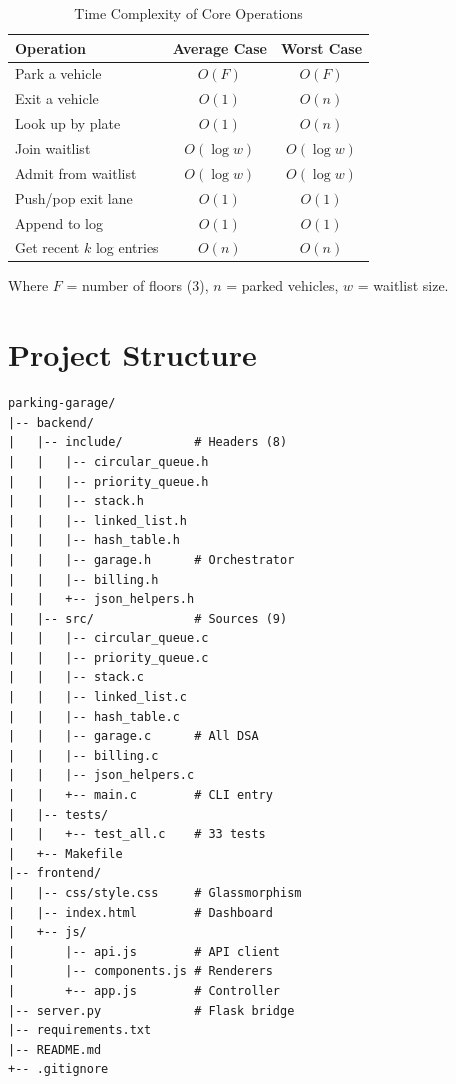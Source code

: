 \documentclass[12pt, a4paper]{report}
\begin{document}
\begin{table}[H]
\centering
\caption{Time Complexity of Core Operations}
\label{tab:complexity}
\begin{tabular}{lcc}
\toprule
\textbf{Operation} & \textbf{Average Case} & \textbf{Worst Case} \\
\midrule
Park a vehicle            & $O(F)$          & $O(F)$        \\
Exit a vehicle            & $O(1)$          & $O(n)$        \\
Look up by plate          & $O(1)$          & $O(n)$        \\
Join waitlist             & $O(\log w)$     & $O(\log w)$   \\
Admit from waitlist       & $O(\log w)$     & $O(\log w)$   \\
Push/pop exit lane        & $O(1)$          & $O(1)$        \\
Append to log             & $O(1)$          & $O(1)$        \\
Get recent $k$ log entries& $O(n)$          & $O(n)$        \\
\bottomrule
\end{tabular}
\end{table}

\noindent Where $F$ = number of floors (3), $n$ = parked vehicles,
$w$ = waitlist size.

\chapter{Project Structure}

\begin{lstlisting}[basicstyle=\footnotesize\ttfamily, frame=single,
  backgroundcolor=\color{codebg}, numbers=none,
  columns=flexible, breaklines=true,
  caption={Directory layout}]
parking-garage/
|-- backend/
|   |-- include/          # Headers (8)
|   |   |-- circular_queue.h
|   |   |-- priority_queue.h
|   |   |-- stack.h
|   |   |-- linked_list.h
|   |   |-- hash_table.h
|   |   |-- garage.h      # Orchestrator
|   |   |-- billing.h
|   |   +-- json_helpers.h
|   |-- src/              # Sources (9)
|   |   |-- circular_queue.c
|   |   |-- priority_queue.c
|   |   |-- stack.c
|   |   |-- linked_list.c
|   |   |-- hash_table.c
|   |   |-- garage.c      # All DSA
|   |   |-- billing.c
|   |   |-- json_helpers.c
|   |   +-- main.c        # CLI entry
|   |-- tests/
|   |   +-- test_all.c    # 33 tests
|   +-- Makefile
|-- frontend/
|   |-- css/style.css     # Glassmorphism
|   |-- index.html        # Dashboard
|   +-- js/
|       |-- api.js        # API client
|       |-- components.js # Renderers
|       +-- app.js        # Controller
|-- server.py             # Flask bridge
|-- requirements.txt
|-- README.md
+-- .gitignore
\end{lstlisting}
\end{document}
